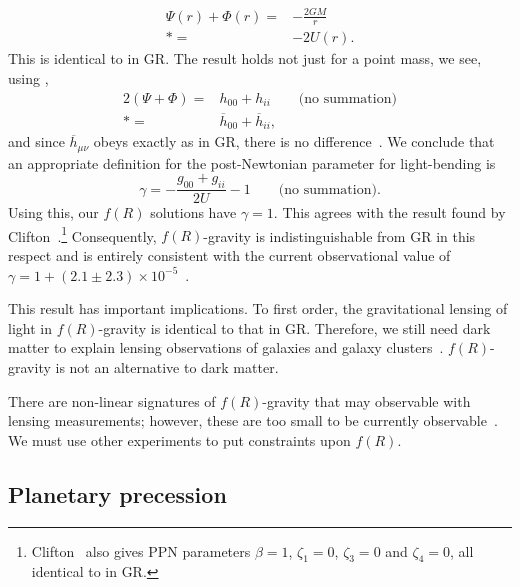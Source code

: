 \begin{align}
\Psi(r) + \Phi(r) = {} & -\frac{2GM}{r} \nonumber \\*
 = {} & -2U(r).
\end{align}
This is identical to in GR. The result holds not just for a point mass, we see, using ,
\begin{align}
2\left(\Psi + \Phi\right) = {} & h_{00} + h_{ii} \qquad \text{(no summation)}\nonumber \\*
 = {} & \overline{h}_{00} + \overline{h}_{ii},
\end{align}
and since $\overline{h}_{\mu\nu}$ obeys  exactly as in GR, there is no difference~\cite{Zhao2011}. We conclude that an appropriate definition for the post-Newtonian parameter for light-bending is
\begin{equation}
\gamma = -\frac{g_{00} + g_{ii}}{2U} - 1 \qquad \text{(no summation)}.
\end{equation}
Using this, our $f(R)$ solutions have $\gamma = 1$. This agrees with the result found by Clifton~\cite{Clifton2008}.\footnote{Clifton~\cite{Clifton2008} also gives PPN parameters $\beta = 1$, $\zeta_1 = 0$, $\zeta_3 = 0$ and $\zeta_4 = 0$, all identical to in GR.} Consequently, $f(R)$-gravity is indistinguishable from GR in this respect and is entirely consistent with the current observational value of $\gamma = 1 + (2.1 \pm 2.3) \times 10^{-5}$~\cite{Will2006, Bertotti2003}.

This result has important implications. To first order, the gravitational lensing of light in $f(R)$-gravity is identical to that in GR. Therefore, we still need dark matter to explain lensing observations of galaxies and galaxy clusters~\cite{Lubini2011}. $f(R)$-gravity is not an alternative to dark matter.

There are non-linear signatures of $f(R)$-gravity that may observable with lensing measurements; however, these are too small to be currently observable~\cite{Vanderveld2011}. We must use other experiments to put constraints upon $f(R)$.

\subsection{Planetary precession}

